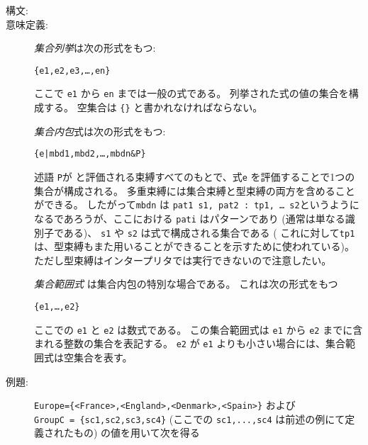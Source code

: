 \documentclass[\pformat,12pt]{jarticle}
\begin{document}
\begin{description}
\item[構文:]
  




\item[意味定義:] {\it 集合列挙}は次の形式をもつ:
  \begin{alltt}
    \{e1, e2, e3, \ldots, en\}
  \end{alltt}
 ここで {\tt e1} から {\tt en} までは一般の式である。
列挙された式の値の集合を構成する。
空集合は \verb+{}+ と書かれなければならない。

    {\it 集合内包}式は次の形式をもつ:
  \begin{alltt}
    \{e | mbd1, mbd2, \ldots, mbdn \& P\}
  \end{alltt}
 述語 {\tt P}が と評価される束縛すべてのもとで、式{\tt e} を評価することで1つの集合が構成される。
多重束縛には集合束縛と型束縛の両方を含めることができる。
したがって{\tt mbdn} は {\tt pat1  s1, pat2 : tp1,
    \ldots {} s2}というようになるであろうが、ここにおける {\tt pati} はパターンであり (通常は単なる識別子である)、 {\tt s1} や {\tt s2} は式で構成される集合である ( これに対して{\tt tp1}は、型束縛もまた用いることができることを示すために使われている)。 
ただし型束縛はインタープリタでは実行できないので注意したい。

   {\it 集合範囲式} は集合内包の特別な場合である。
これは次の形式をもつ
  \begin{alltt}
    \{e1, \ldots, e2\}
  \end{alltt}
 ここでの {\tt e1} と {\tt e2} は数式である。
この集合範囲式は {\tt e1} から {\tt e2} までに含まれる整数の集合を表記する。
 {\tt e2} が {\tt e1} よりも小さい場合には、集合範囲式は空集合を表す。

\item[例題:] 
 \texttt{Europe=\{<France>,<England>,<Denmark>,<Spain>\}} および \\
 \texttt{GroupC = \{sc1,sc2,sc3,sc4\}} (ここでの \texttt{sc1,...,sc4} は前述の例にて定義されたもの) の値を用いて次を得る


\end{description}
\end{document}
